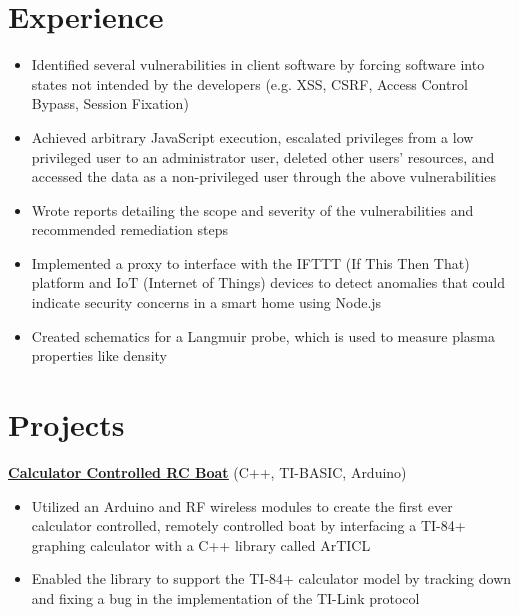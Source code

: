 \documentclass[letterpaper,11pt]{article}
\begin{document}
\section{Experience}
\begin{itemize}
    \item Identified several vulnerabilities in client software by forcing software into states not intended by the developers (e.g. XSS, CSRF, Access Control Bypass, Session Fixation)
    \item Achieved arbitrary JavaScript execution, escalated privileges from a low privileged user to an administrator user, deleted other users' resources, and accessed the data as a non-privileged user through the above vulnerabilities
    \item Wrote reports detailing the scope and severity of the vulnerabilities and recommended remediation steps

\end{itemize}
\begin{itemize}
    \item Implemented a proxy to interface with the IFTTT (If This Then That) platform and IoT (Internet of Things) devices to detect anomalies that could indicate security concerns in a smart home using Node.js
\end{itemize}
\begin{itemize}
    \item Created schematics for a Langmuir probe, which is used to measure plasma properties like density
\end{itemize}

\section{Projects}

\textbf{\href{https://youtu.be/dQw4w9WgXcQ}{\underline{Calculator Controlled RC Boat}}} \hfill (C++, TI-BASIC, Arduino)
\begin{itemize}
    \item Utilized an Arduino and RF wireless modules to create the first ever calculator controlled, remotely controlled boat by interfacing a TI-84+ graphing calculator with a C++ library called ArTICL
    \item Enabled the library to support the TI-84+ calculator model by tracking down and fixing a bug in the implementation of the TI-Link protocol
\end{itemize}
\end{document}
